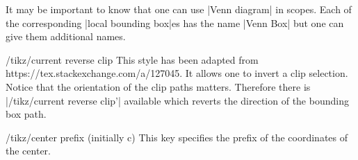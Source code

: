 \documentclass[a4paper]{ltxdoc}
\begin{document}
\begin{codeexample}[width=5cm]
\end{codeexample}

It may be important to know that one can use |Venn diagram| in scopes. Each of
the corresponding |local bounding box|es has the name |Venn Box| but one can
give them additional names.

\begin{codeexample}[]
\end{codeexample}

\begin{key}{/tikz/current reverse clip }
        This style has been adapted from https://tex.stackexchange.com/a/127045.
		It allows one to invert a clip selection. Notice that the orientation of
		the clip paths matters. Therefore there is |/tikz/current reverse clip'|
		available which reverts the direction of the bounding box path.
\end{key}

\begin{key}{/tikz/center prefix (initially c)}
        This key specifies the prefix of the coordinates of the center.
\end{key}

\begin{codeexample}[]
\end{codeexample}
\end{document}
